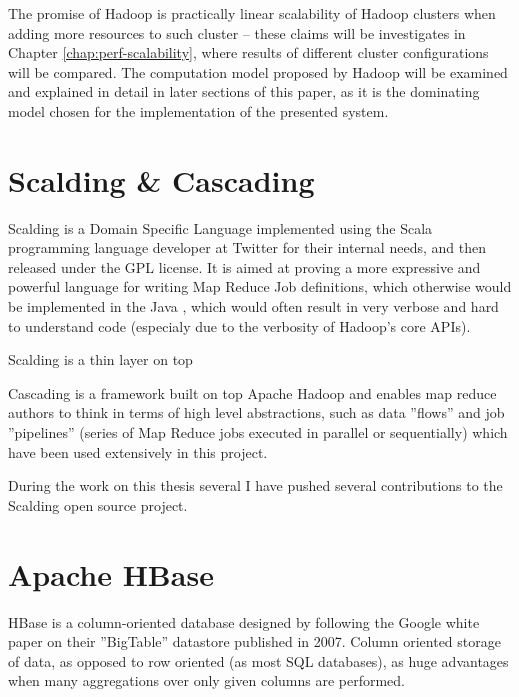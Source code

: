The promise of Hadoop is practically linear scalability of Hadoop clusters when adding more resources to such cluster -- these claims will be investigates in Chapter \ref{chap:perf-scalability}, where results of different cluster configurations will be compared. The computation model proposed by Hadoop will be examined and explained in detail in later sections of this paper, as it is the dominating model chosen for the implementation of the presented system.

\section{Scalding \& Cascading}
\label{sec:scalding-info}

Scalding is a Domain Specific Language implemented using the Scala \cite{scala} programming language developer at Twitter \cite{twitter} for their internal needs, and then released under the GPL license. It is aimed at proving a more expressive and powerful language for writing Map Reduce Job definitions, which otherwise
would be implemented in the Java \cite{java}, which would often result in very verbose and hard to understand code (especialy due to the verbosity of Hadoop's core APIs).

Scalding is a thin layer on top

Cascading is a framework built on top Apache Hadoop and enables map reduce authors to think in terms of high level abstractions, such as data ''flows'' 
and job ''pipelines'' (series of Map Reduce jobs executed in parallel or sequentially) which have been used extensively in this project.

During the work on this thesis several I have pushed several contributions to the Scalding open source project.


\section{Apache HBase}
\label{sec:hbase}

HBase is a column-oriented database \cite{columnar-database} designed by following the Google white paper on their ''BigTable'' datastore published in 2007.
Column oriented storage of data, as opposed to row oriented (as most SQL databases), as huge advantages when many aggregations over only given columns are performed.

